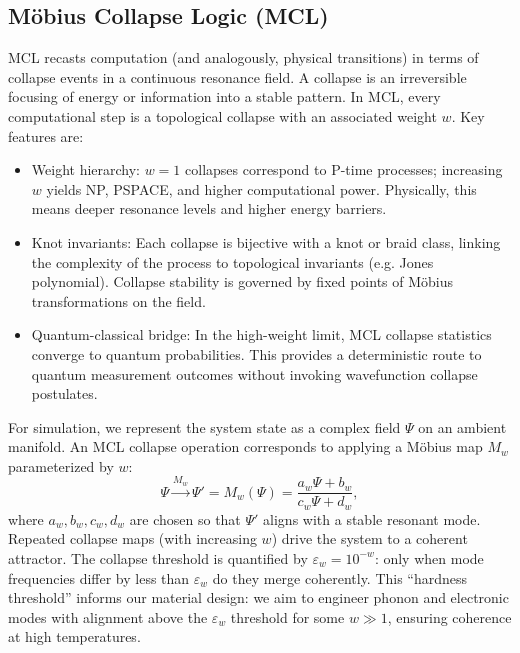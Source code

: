 \documentclass[11pt,a4paper]{article}
\begin{document}
\subsection{Möbius Collapse Logic (MCL)}
\label{subsec:mcl}
MCL recasts computation (and analogously, physical transitions) in terms of collapse events in a continuous resonance field. A collapse is an irreversible focusing of energy or information into a stable pattern. In MCL, every computational step is a topological collapse with an associated weight 
$w$. Key features are:
\begin{itemize}
\item Weight hierarchy: 
$w=1$ collapses correspond to P-time processes; increasing 
$w$ yields NP, PSPACE, and higher computational power. Physically, this means deeper resonance levels and higher energy barriers.
\item Knot invariants: Each collapse is bijective with a knot or braid class, linking the complexity of the process to topological invariants (e.g. Jones polynomial). Collapse stability is governed by fixed points of Möbius transformations on the field.
\item Quantum-classical bridge: In the high-weight limit, MCL collapse statistics converge to quantum probabilities. This provides a deterministic route to quantum measurement outcomes without invoking wavefunction collapse postulates.
\end{itemize}
For simulation, we represent the system state as a complex field 
$\Psi$ on an ambient manifold. An MCL collapse operation corresponds to applying a Möbius map 
$M_w$ parameterized by 
$w$:
\begin{equation}
\Psi \xrightarrow{M_w} \Psi' = M_w(\Psi) = \frac{a_w \Psi + b_w}{c_w \Psi + d_w},
\end{equation}
where 
$a_w, b_w, c_w, d_w$ are chosen so that 
$\Psi'$ aligns with a stable resonant mode. Repeated collapse maps (with increasing 
$w$) drive the system to a coherent attractor. The collapse threshold is quantified by 
$\varepsilon_w = 10^{-w}$: only when mode frequencies differ by less than 
$\varepsilon_w$ do they merge coherently. This “hardness threshold” informs our material design: we aim to engineer phonon and electronic modes with alignment above the 
$\varepsilon_w$ threshold for some 
$w \gg 1$, ensuring coherence at high temperatures.
\end{document}
